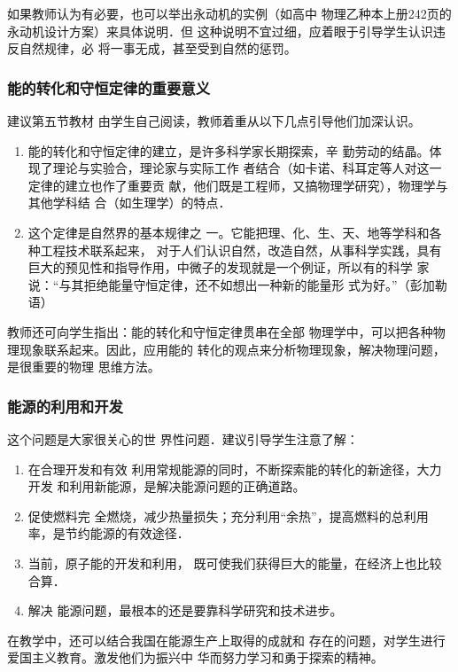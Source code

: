 如果教师认为有必要，也可以举出永动机的实例（如高中
物理乙种本上册242页的永动机设计方案）来具体说明．但
这种说明不宜过细，应着眼于引导学生认识违反自然规律，必
将一事无成，甚至受到自然的惩罚。

\subsubsection{能的转化和守恒定律的重要意义}

建议第五节教材
由学生自己阅读，教师着重从以下几点引导他们加深认识。
\begin{enumerate}
\item 能的转化和守恒定律的建立，是许多科学家长期探索，辛
勤劳动的结晶。体现了理论与实验合，理论家与实际工作
者结合（如卡诺、科耳定等人对这一定律的建立也作了重要贡
献，他们既是工程师，又搞物理学研究），物理学与其他学科结
合（如生理学）的特点．
\item 这个定律是自然界的基本规律之
一。它能把理、化、生、天、地等学科和各种工程技术联系起来，
对于人们认识自然，改造自然，从事科学实践，具有巨大的预见性和指导作用，中微子的发现就是一个例证，所以有的科学
家说：“与其拒绝能量守恒定律，还不如想出一种新的能量形
式为好。”（彭加勒语）
\end{enumerate}

教师还可向学生指出：能的转化和守恒定律贯串在全部
物理学中，可以把各种物理现象联系起来。因此，应用能的
转化的观点来分析物理现象，解决物理问题，是很重要的物理
思维方法。

\subsubsection{能源的利用和开发}
 这个问题是大家很关心的世
界性问题．建议引导学生注意了解：
\begin{enumerate}
\item 在合理开发和有效
利用常规能源的同时，不断探索能的转化的新途径，大力开发
和利用新能源，是解决能源问题的正确道路。    
\item 促使燃料完
全燃烧，减少热量损失；充分利用“余热”，提高燃料的总利用
率，是节约能源的有效途径．    
\item 当前，原子能的开发和利用，
既可使我们获得巨大的能量，在经济上也比较合算．   
 \item 解决
能源问题，最根本的还是要靠科学研究和技术进步。
\end{enumerate}

在教学中，还可以结合我国在能源生产上取得的成就和
存在的问题，对学生进行爱国主义教育。激发他们为振兴中
华而努力学习和勇于探索的精神。

